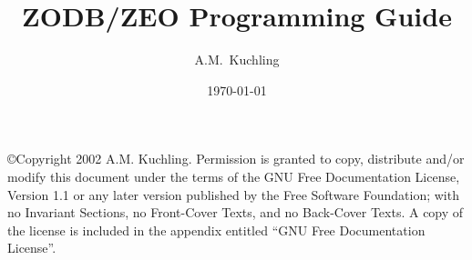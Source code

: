 \documentclass{howto}
\title{ZODB/ZEO Programming Guide}
\date{\today}
\author{A.M.\ Kuchling}
\begin{document}
\maketitle
\tableofcontents

\copyright{Copyright 2002 A.M. Kuchling.
      Permission is granted to copy, distribute and/or modify this document
      under the terms of the GNU Free Documentation License, Version 1.1
      or any later version published by the Free Software Foundation;
      with no Invariant Sections, no Front-Cover Texts, and no Back-Cover Texts.
      A copy of the license is included in the appendix entitled ``GNU
      Free Documentation License''.}







\appendix


\end{document}
